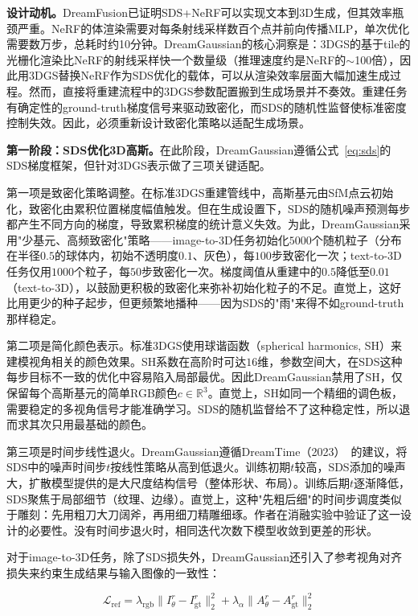 \textbf{设计动机。}DreamFusion已证明SDS+NeRF可以实现文本到3D生成，但其效率瓶颈严重。NeRF的体渲染需要对每条射线采样数百个点并前向传播MLP，单次优化需要数万步，总耗时约10分钟。DreamGaussian的核心洞察是：3DGS的基于tile的光栅化渲染比NeRF的射线采样快一个数量级（推理速度约是NeRF的$\sim$100倍），因此用3DGS替换NeRF作为SDS优化的载体，可以从渲染效率层面大幅加速生成过程。然而，直接将重建流程中的3DGS参数配置搬到生成场景并不奏效。重建任务有确定性的ground-truth梯度信号来驱动致密化，而SDS的随机性监督使标准密度控制失效。因此，必须重新设计致密化策略以适配生成场景。

\textbf{第一阶段：SDS优化3D高斯。}在此阶段，DreamGaussian遵循公式~\eqref{eq:sds}的SDS梯度框架，但针对3DGS表示做了三项关键适配。

第一项是致密化策略调整。在标准3DGS重建管线中，高斯基元由SfM点云初始化，致密化由累积位置梯度幅值触发。但在生成设置下，SDS的随机噪声预测每步都产生不同方向的梯度，导致累积梯度的统计意义失效。为此，DreamGaussian采用"少基元、高频致密化"策略——image-to-3D任务初始化$5000$个随机粒子（分布在半径$0.5$的球体内，初始不透明度$0.1$、灰色），每$100$步致密化一次；text-to-3D任务仅用$1000$个粒子，每$50$步致密化一次。梯度阈值从重建中的$0.5$降低至$0.01$（text-to-3D），以鼓励更积极的致密化来弥补初始化粒子的不足。直觉上，这好比用更少的种子起步，但更频繁地播种——因为SDS的"雨"来得不如ground-truth那样稳定。

第二项是简化颜色表示。标准3DGS使用球谐函数（spherical harmonics, SH）来建模视角相关的颜色效果。SH系数在高阶时可达$16$维，参数空间大，在SDS这种每步目标不一致的优化中容易陷入局部最优。因此DreamGaussian禁用了SH，仅保留每个高斯基元的简单RGB颜色$c \in \mathbb{R}^3$。直觉上，SH如同一个精细的调色板，需要稳定的多视角信号才能准确学习。SDS的随机监督给不了这种稳定性，所以退而求其次只用最基础的颜色。

第三项是时间步线性退火。DreamGaussian遵循DreamTime（2023）~\cite{huang2023dreamtime}的建议，将SDS中的噪声时间步$t$按线性策略从高到低退火。训练初期$t$较高，SDS添加的噪声大，扩散模型提供的是大尺度结构信号（整体形状、布局）。训练后期$t$逐渐降低，SDS聚焦于局部细节（纹理、边缘）。直觉上，这种"先粗后细"的时间步调度类似于雕刻：先用粗刀大刀阔斧，再用细刀精雕细琢。作者在消融实验中验证了这一设计的必要性。没有时间步退火时，相同迭代次数下模型收敛到更差的形状。

对于image-to-3D任务，除了SDS损失外，DreamGaussian还引入了参考视角对齐损失来约束生成结果与输入图像的一致性：

\begin{equation}
\label{eq:dg_ref}
\mathcal{L}_{\text{ref}} = \lambda_{\text{rgb}} \|I^r_\theta - I^r_{\text{gt}}\|_2^2 + \lambda_{\alpha} \|A^r_\theta - A^r_{\text{gt}}\|_2^2
\end{equation}

